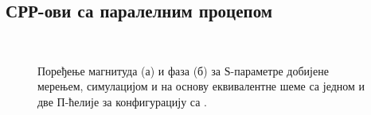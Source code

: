 \documentclass[main.tex]{subfiles}
\begin{document}
\subsection{СРР-ови са паралелним процепом}

\begin{figure}[!t]
\centering
{}\\
\caption{Поређење магнитуда (а) и фаза (б) за $Ѕ$-параметре добијене мерењем, симулацијом и на основу еквивалентне шеме са једном и две П-ћелије за конфигурацију са .}\label{f10}
\end{figure}
\end{document}
